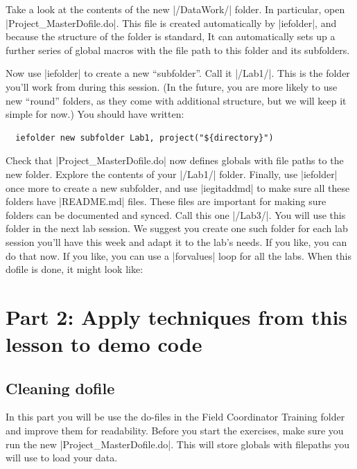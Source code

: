 \documentclass{tufte-handout}
\begin{document}
Take a look at the contents of the new |/DataWork/| folder.
In particular, open |Project_MasterDofile.do|.
This file is created automatically by |iefolder|,
and because the structure of the folder is standard,
It can automatically sets up a further series of global macros
with the file path to this folder and its subfolders.

Now use |iefolder| to create a new ``subfolder''.
Call it |/Lab1/|. This is the folder you’ll work from during this session.
(In the future, you are more likely to use new ``round'' folders,
as they come with additional structure,
but we will keep it simple for now.)
You should have written:
\begin{Verbatim}
  iefolder new subfolder Lab1, project("${directory}")
\end{Verbatim}
Check that |Project_MasterDofile.do| now defines globals
with file paths to the new folder.
Explore the contents of your |/Lab1/| folder.
Finally, use |iefolder| once more to create a new subfolder,
and use |iegitaddmd|
to make sure all these folders have |README.md| files.
These files are important for making sure folders can be documented and synced.
Call this one |/Lab3/|. You will use this folder in the next lab session.
We suggest you create one such folder for each lab session you’ll have this week
and adapt it to the lab’s needs. If you like, you can do that now.
If you like, you can use a |forvalues| loop for all the labs.
When this dofile is done, it might look like:

\begin{figure}
{
}
\end{figure}

\section{Part 2: Apply techniques from this lesson to demo code}

\subsection{Cleaning dofile}

In this part you will be use the do-files in the Field Coordinator Training folder
and improve them for readability.
Before you start the exercises, make sure you run the new |Project_MasterDofile.do|.
This will store globals with filepaths you will use to load your data.
\end{document}

